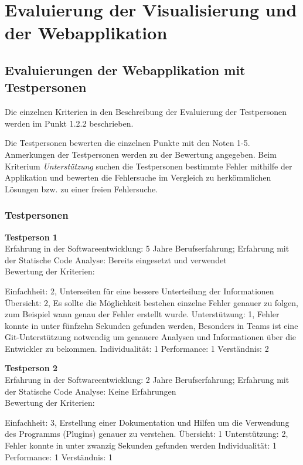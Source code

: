 \section{Evaluierung der Visualisierung und der Webapplikation} 

\subsection{Evaluierungen der Webapplikation mit Testpersonen}
Die einzelnen Kriterien in den Beschreibung der Evaluierung der Testpersonen werden im Punkt 1.2.2 beschrieben. 

Die Testpersonen bewerten die einzelnen Punkte mit den Noten 1-5. Anmerkungen der Testpersonen werden zu der Bewertung angegeben. Beim Kriterium \textit{Unterstützung} suchen die Testpersonen bestimmte Fehler  mithilfe der Applikation und bewerten die Fehlersuche im Vergleich zu herkömmlichen Lösungen bzw. zu einer freien Fehlersuche.
\subsubsection{Testpersonen}
\textbf{Testperson 1} \\
Erfahrung in der Softwareentwicklung: 5 Jahre Berufserfahrung; Erfahrung mit der Statische Code Analyse: Bereits eingesetzt und verwendet \\
Bewertung der Kriterien:

Einfachheit: 2, Unterseiten für eine bessere Unterteilung der Informationen \newline Übersicht: 2, Es sollte die Möglichkeit bestehen einzelne Fehler genauer zu folgen, zum Beispiel wann genau der Fehler erstellt wurde. \newline  Unterstützung: 1, Fehler konnte in unter fünfzehn Sekunden gefunden werden, Besonders in Teams ist eine Git-Unterstützung notwendig um genauere Analysen und Informationen über die Entwickler zu bekommen.  \newline  Individualität: 1 \newline  Performance: 1 \newline  Verständnis: 2 \newline 

\textbf{Testperson 2} \\
Erfahrung in der Softwareentwicklung: 2 Jahre Berufserfahrung; Erfahrung mit der Statische Code Analyse: Keine Erfahrungen\\
Bewertung der Kriterien:

Einfachheit: 3, Erstellung einer Dokumentation und Hilfen um die Verwendung des Programms (Plugins) genauer zu verstehen. \newline  Übersicht: 1 \newline  Unterstützung: 2, Fehler konnte in unter zwanzig Sekunden gefunden werden \newline  Individualität: 1 \newline  Performance: 1 \newline  Verständnis: 1 \newline 

